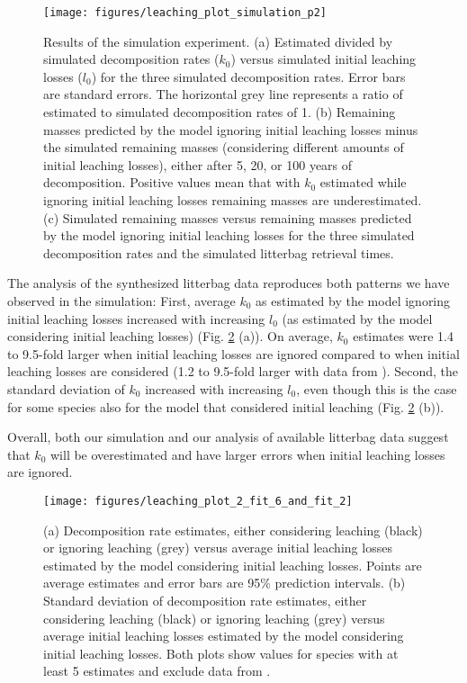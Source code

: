 \documentclass[bg, manuscript]{copernicus}
\begin{document}
\begin{figure}[H]

{\centering \texttt{[image: figures/leaching\_plot\_simulation\_p2]} 

}

\caption{Results of the simulation experiment. (a) Estimated divided by simulated decomposition rates (\(k_0\)) versus simulated initial leaching losses (\(l_0\)) for the three simulated decomposition rates. Error bars are standard errors. The horizontal grey line represents a ratio of estimated to simulated decomposition rates of 1. (b) Remaining masses predicted by the model ignoring initial leaching losses minus the simulated remaining masses (considering different amounts of initial leaching losses), either after 5, 20, or 100 years of decomposition. Positive values mean that with \(k_0\) estimated while ignoring initial leaching losses remaining masses are underestimated. (c) Simulated remaining masses versus remaining masses predicted by the model ignoring initial leaching losses for the three simulated decomposition rates and the simulated litterbag retrieval times.}\label{fig:out-p-simulation-p2}
\end{figure}

The analysis of the synthesized litterbag data reproduces both patterns we have observed in the simulation: First, average \(k_0\) as estimated by the model ignoring initial leaching losses increased with increasing \(l_0\) (as estimated by the model considering initial leaching losses) (Fig. \ref{fig:out-mm27-1-mm28-1-p2} (a)). On average, \(k_0\) estimates were 1.4 to 9.5-fold larger when initial leaching losses are ignored compared to when initial leaching losses are considered (1.2 to 9.5-fold larger with data from \citet{Bengtsson.2017}). Second, the standard deviation of \(k_0\) increased with increasing \(l_0\), even though this is the case for some species also for the model that considered initial leaching (Fig. \ref{fig:out-mm27-1-mm28-1-p2} (b)).

Overall, both our simulation and our analysis of available litterbag data suggest that \(k_0\) will be overestimated and have larger errors when initial leaching losses are ignored.



\begin{figure}[H]

{\centering \texttt{[image: figures/leaching\_plot\_2\_fit\_6\_and\_fit\_2]} 

}

\caption{(a) Decomposition rate estimates, either considering leaching (black) or ignoring leaching (grey) versus average initial leaching losses estimated by the model considering initial leaching losses. Points are average estimates and error bars are 95\% prediction intervals. (b) Standard deviation of decomposition rate estimates, either considering leaching (black) or ignoring leaching (grey) versus average initial leaching losses estimated by the model considering initial leaching losses. Both plots show values for species with at least 5 estimates and exclude data from \citet{Bengtsson.2017}.}\label{fig:out-mm27-1-mm28-1-p2}
\end{figure}
\end{document}
